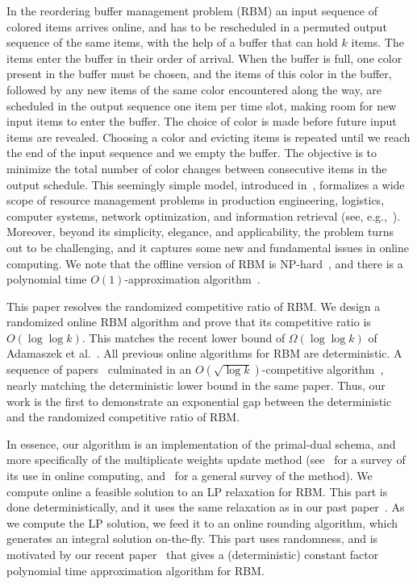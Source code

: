\documentclass[12pt]{article}
\begin{document}
In the reordering buffer management problem (RBM) an input
sequence of colored items arrives online, and has to be rescheduled 
in a permuted output sequence of the same items, with the help 
of a buffer that can hold $k$ items. The items enter the buffer 
in their order of arrival. When the buffer is full, one color present
in the buffer must be chosen, and the items of this color in the
buffer, followed by any new items of the same color encountered 
along the way, are scheduled in the output sequence one item
per time slot, making room for new input items to enter the
buffer. The choice of color is made before future input items 
are revealed. Choosing a color
and evicting items is repeated until we reach the end of the 
input sequence and we empty the buffer. The objective is to 
minimize the total number of color changes between consecutive 
items in the output schedule. This seemingly simple model, 
introduced in~\cite{RSW02}, formalizes a wide scope of resource 
management problems in production engineering, logistics, 
computer systems, network optimization, and information retrieval 
(see, e.g.,~\cite{RSW02,BB02,KRSW04,GSV04}). Moreover, 
beyond its simplicity, elegance, and applicability, the problem
turns out to be challenging, and it captures some new and 
fundamental issues in online computing. We note that the
offline version of RBM is NP-hard~\cite{AKM10,CMSS10}, and
there is a polynomial time $O(1)$-approximation algorithm~\cite{AR13}.

This paper resolves the randomized competitive ratio of RBM.
We design a randomized online RBM algorithm and prove that
its competitive ratio is $O(\log\log k)$. This matches the
recent lower bound of $\Omega(\log\log k)$ of Adamaszek
et al.~\cite{ACER11}.
All previous online algorithms for RBM are deterministic. A
sequence of papers~\cite{RSW02,EW05,AR10,ACER11}
culminated in an 
$O(\sqrt{\log k})$-competitive algorithm~\cite{ACER11},
nearly matching the deterministic lower bound in the same
paper. Thus, our work is the first to demonstrate an
exponential gap between the deterministic and the randomized 
competitive ratio of RBM.

In essence, our algorithm is an implementation of the primal-dual 
schema, and more specifically of the multiplicate weights update
method (see~\cite{BN09} for a survey of its use in online computing,
and~\cite{AHK12} for a general survey of the method). 
We compute online a feasible solution 
to an LP relaxation
for RBM. This part is done deterministically, and it uses the same
relaxation as in our past paper~\cite{AR10}. As we compute the LP 
solution, we feed it to an online rounding algorithm, which generates 
an integral solution on-the-fly. This part uses randomness, and is
motivated by our recent paper~\cite{AR13} that gives a (deterministic)
constant factor polynomial time approximation algorithm for RBM.
\end{document}
